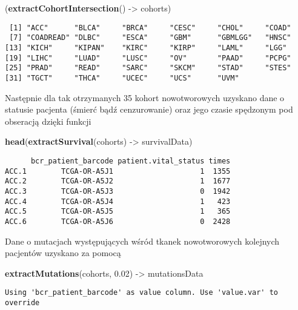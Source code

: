 \documentclass[]{article}
\newenvironment{Shaded}{\begin{snugshade}}{\end{snugshade}}
\newcommand{\KeywordTok}[1]{\textcolor[rgb]{0.13,0.29,0.53}{\textbf{{#1}}}}
\newcommand{\FloatTok}[1]{\textcolor[rgb]{0.00,0.00,0.81}{{#1}}}
\newcommand{\StringTok}[1]{\textcolor[rgb]{0.31,0.60,0.02}{{#1}}}
\newcommand{\NormalTok}[1]{{#1}}
\begin{document}
\begin{Shaded}
\begin{Highlighting}[]
\NormalTok{(}\KeywordTok{extractCohortIntersection}\NormalTok{() ->}\StringTok{ }\NormalTok{cohorts)}
\end{Highlighting}
\end{Shaded}

\begin{verbatim}
 [1] "ACC"      "BLCA"     "BRCA"     "CESC"     "CHOL"     "COAD"    
 [7] "COADREAD" "DLBC"     "ESCA"     "GBM"      "GBMLGG"   "HNSC"    
[13] "KICH"     "KIPAN"    "KIRC"     "KIRP"     "LAML"     "LGG"     
[19] "LIHC"     "LUAD"     "LUSC"     "OV"       "PAAD"     "PCPG"    
[25] "PRAD"     "READ"     "SARC"     "SKCM"     "STAD"     "STES"    
[31] "TGCT"     "THCA"     "UCEC"     "UCS"      "UVM"     
\end{verbatim}

Następnie dla tak otrzymanych 35 kohort nowotworowych uzyskano dane o
statusie pacjenta (śmierć bądź cenzurowanie) oraz jego czasie spędzonym
pod obseracją dzięki funkcji

\begin{Shaded}
\begin{Highlighting}[]
\KeywordTok{head}\NormalTok{(}\KeywordTok{extractSurvival}\NormalTok{(cohorts) ->}\StringTok{ }\NormalTok{survivalData)}
\end{Highlighting}
\end{Shaded}

\begin{verbatim}
      bcr_patient_barcode patient.vital_status times
ACC.1        TCGA-OR-A5J1                    1  1355
ACC.2        TCGA-OR-A5J2                    1  1677
ACC.3        TCGA-OR-A5J3                    0  1942
ACC.4        TCGA-OR-A5J4                    1   423
ACC.5        TCGA-OR-A5J5                    1   365
ACC.6        TCGA-OR-A5J6                    0  2428
\end{verbatim}

Dane o mutacjach występujących wśród tkanek nowotworowych kolejnych
pacjentów uzyskano za pomocą

\begin{Shaded}
\begin{Highlighting}[]
\KeywordTok{extractMutations}\NormalTok{(cohorts, }\FloatTok{0.02}\NormalTok{) ->}\StringTok{ }\NormalTok{mutationsData}
\end{Highlighting}
\end{Shaded}

\begin{verbatim}
Using 'bcr_patient_barcode' as value column. Use 'value.var' to override
\end{verbatim}
\end{document}
